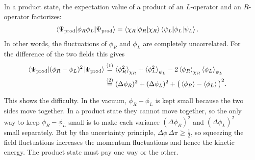 In a product state, the expectation value of a product of an $L$-operator and an $R$-operator factorizes:
\begin{equation}
\braket{\Psi_{\rm prod} | \phi_R \phi_L | \Psi_{\rm prod}} = \braket{\chi_R | \phi_R | \chi_R} \braket{\psi_L | \phi_L | \psi_L} .
\label{eq:product_state_covariance_zero}
\end{equation}
In other words, the fluctuations of $\phi_R$ and $\phi_L$ are completely uncorrelated. For the difference of
the two fields this gives
\begin{align}
\braket{\Psi_{\rm prod} | (\phi_R - \phi_L)^2 | \Psi_{\rm prod}}
&\overset{(1)}{=} \braket{\phi_R^2}_{\chi_R} + \braket{\phi_L^2}_{\psi_L} - 2\braket{\phi_R}_{\chi_R}\braket{\phi_L}_{\psi_L} \notag \\
&\overset{(2)}{=} (\Delta\phi_R)^2 + (\Delta\phi_L)^2 + \big(\braket{\phi_R}-\braket{\phi_L}\big)^2 .
\label{eq:prod_diff_squared}
\end{align}
\quad
{}

This shows the difficulty. In the vacuum, $\phi_R-\phi_L$ is kept small because the two sides move together.
In a product state they cannot move together, so the only way to keep $\phi_R-\phi_L$ small is to make each
variance $(\Delta\phi_R)^2$ and $(\Delta\phi_L)^2$ small separately. But by the uncertainty principle,
$\Delta\phi\,\Delta\pi\ge\tfrac12$, so squeezing the field fluctuations increases the momentum fluctuations
and hence the kinetic energy. The product state must pay one way or the other.

